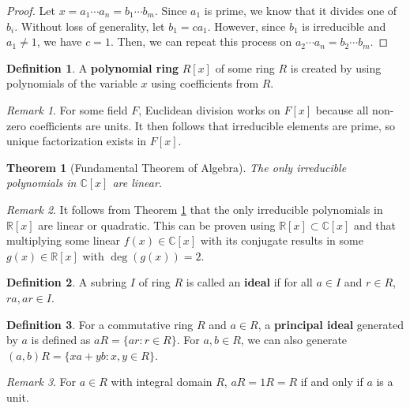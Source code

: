 \documentclass[parskip=half]{scrartcl}  %
\theoremstyle{definition}
\newtheorem{definition}{Definition}[section]
\theoremstyle{plain}
\newtheorem{theorem}{Theorem}[definition]
\theoremstyle{remark}
\newtheorem{remark}{Remark}[definition]
\begin{document}
\begin{proof}
    Let $x=a_1\cdots a_n=b_1\cdots b_m$.
    Since $a_1$ is prime, we know that it divides one of $b_i$.
    Without loss of generality, let $b_1=ca_1$.
    However, since $b_1$ is irreducible and $a_1\neq 1$, we have $c=1$.
    Then, we can repeat this process on $a_2\cdots a_n=b_2\cdots b_m$.
\end{proof}

\begin{definition}
    A \textbf{polynomial ring} $R[x]$ of some ring $R$ is created by using
    polynomials of the variable $x$ using coefficients from $R$.
\end{definition}

\begin{remark}
    For some field $F$, Euclidean division works on $F[x]$ because all non-zero
    coefficients are units.
    It then follows that irreducible elements are prime, so unique factorization
    exists in $F[x]$.
\end{remark}

\begin{theorem}[Fundamental Theorem of Algebra]
    \label{thm:fundamental theorem of algebra}
    The only irreducible polynomials in $\mathbb{C}[x]$ are linear.
\end{theorem}

\begin{remark}
    It follows from Theorem \ref{thm:fundamental theorem of algebra} that the
    only irreducible polynomials in $\mathbb{R}[x]$ are linear or quadratic.
    This can be proven using $\mathbb{R}[x]\subset\mathbb{C}[x]$ and that
    multiplying some linear $f(x)\in\mathbb{C}[x]$ with its conjugate results
    in some $g(x)\in\mathbb{R}[x]$ with $\deg(g(x))=2$.
\end{remark}

\begin{definition}
    A subring $I$ of ring $R$ is called an \textbf{ideal} if for all
    $a\in I$ and $r\in R$, $ra,ar\in I$.
\end{definition}

\begin{definition}
    For a commutative ring $R$ and $a\in R$, a \textbf{principal ideal}
    generated by $a$ is defined as $aR=\{ar:r\in R\}$.
    For $a,b\in R$, we can also generate $(a,b)R=\{xa+yb:x,y\in R\}$.
\end{definition}

\begin{remark}
    For $a\in R$ with integral domain $R$, $aR=1R=R$ if and only if $a$ is a
    unit.
\end{remark}
\end{document}
